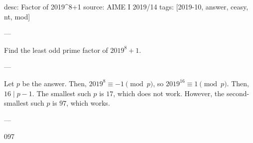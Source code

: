 desc: Factor of 2019^8+1
source: AIME I 2019/14
tags: [2019-10, answer, ceasy, nt, mod]

---

Find the least odd prime factor of $2019^8+1$.

---

Let $p$ be the answer. Then, $2019^8\equiv -1\pmod p$, so $2019^{16}\equiv 1\pmod p$. Then, $16\mid p-1$. The smallest such $p$ is $17$, which does not work. However, the second-smallest such $p$ is $97$, which works.

---

097
